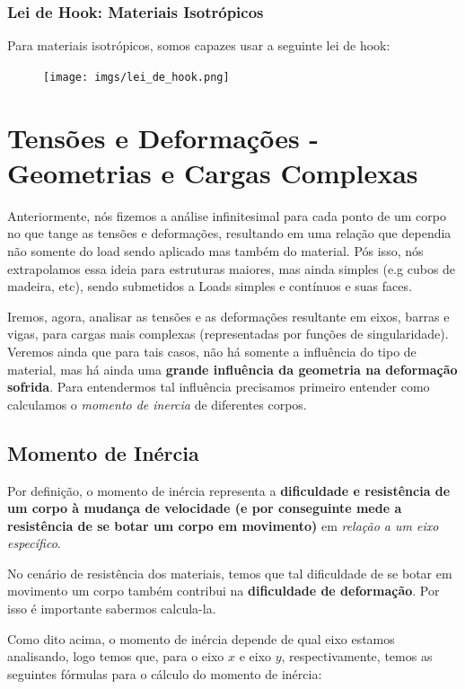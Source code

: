 \documentclass{article}
\begin{document}
\newpage
\subsubsection{Lei de Hook: Materiais Isotrópicos}
Para materiais isotrópicos, somos capazes usar a seguinte lei de hook:

\begin{figure}[h]
    \centering
    \texttt{[image: imgs/lei\_de\_hook.png]}
\end{figure}


\newpage
\section{Tensões e Deformações - Geometrias e Cargas Complexas}
Anteriormente, nós fizemos a análise infinitesimal para cada ponto de um corpo no que tange as tensões e deformações, resultando em uma relação
que dependia não somente do load sendo aplicado mas também do material. Pós isso, nós extrapolamos essa ideia para estruturas maiores, mas ainda simples (e.g cubos de madeira, etc), sendo
submetidos a Loads simples e contínuos e suas faces.

Iremos, agora, analisar as tensões e as deformações resultante em eixos, barras e vigas, para cargas mais complexas (representadas por funções de singularidade). Veremos ainda que para tais casos,
não há somente a influência do tipo de material, mas há ainda uma \textbf{grande influência da geometria na deformação sofrida}. Para entendermos tal influência precisamos primeiro entender como calculamos
o \emph{momento de inercia} de diferentes corpos.

\subsection{Momento de Inércia}
Por definição, o momento de inércia representa a \textbf{dificuldade e resistência de um corpo à mudança de velocidade (e por conseguinte mede a resistência de se botar um corpo em movimento)} em \emph{relação a um eixo específico}.

No cenário de resistência dos materiais, temos que tal dificuldade de se botar em movimento um corpo também contribui na \textbf{dificuldade de deformação}. Por isso é importante sabermos calcula-la.

Como dito acima, o momento de inércia depende de qual eixo estamos analisando, logo temos que, para o eixo $x$ e eixo $y$, respectivamente, temos as seguintes fórmulas para o cálculo do momento de inércia:
\end{document}
